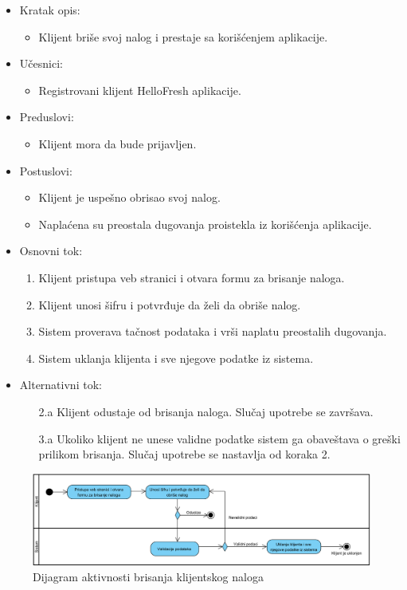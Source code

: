 
\begin{itemize}
    \item Kratak opis:
        \begin{itemize}
            \item Klijent briše svoj nalog i prestaje sa korišćenjem aplikacije.
        \end{itemize}
    \item Učesnici:
        \begin{itemize}
            \item Registrovani klijent HelloFresh aplikacije.
        \end{itemize}
    \item Preduslovi:
        \begin{itemize}
            \item Klijent mora da bude prijavljen.
        \end{itemize}
    \item Postuslovi:
        \begin{itemize}
            \item Klijent je uspešno obrisao svoj nalog.
            \item Naplaćena su preostala dugovanja proistekla iz korišćenja aplikacije.
        \end{itemize}
    \item Osnovni tok:
        \begin{enumerate}
            \item Klijent pristupa veb stranici i otvara formu za brisanje naloga.
            \item Klijent unosi šifru i potvrđuje da želi da obriše nalog.
            \item Sistem proverava tačnost podataka i vrši naplatu preostalih dugovanja.
            \item Sistem uklanja klijenta i sve njegove podatke iz sistema.
        \end{enumerate}
    \item Alternativni tok:
        \begin{itemize}
            \item[2.a] Klijent odustaje od brisanja naloga. Slučaj upotrebe se završava.
			\item[3.a] Ukoliko klijent ne unese validne podatke sistem ga obaveštava o greški prilikom brisanja. Slučaj upotrebe se nastavlja od koraka 2.
        \end{itemize}
\end{itemize}

\begin{figure}[H]
\begin{center}
\includegraphics[width=\textwidth]{Pictures/activity_client_delete.png}
\end{center}
    \caption{Dijagram aktivnosti brisanja klijentskog naloga}
\label{fig:ActivityClientDelete}
\end{figure}